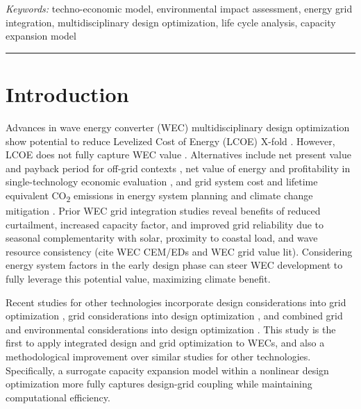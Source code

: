 \documentclass[10pt,twoside]{article}
\begin{document}
\vspace{.5\baselineskip}
\textit{Keywords:} techno-economic model, environmental impact assessment, energy grid integration, multidisciplinary design optimization, life cycle analysis, capacity expansion model

\noindent\rule{\textwidth}{0.4pt}

\section{Introduction}
Advances in wave energy converter (WEC) multidisciplinary design optimization show potential to reduce Levelized Cost of Energy (LCOE) X-fold \cite{mccabe_leveraging_2025}.
However, LCOE does not fully capture WEC value \cite{mowers_evaluation_2021,moraski_beyond_2025}.
Alternatives include net present value and payback period for off-grid contexts \cite{jenne_powering_2021}, net value of energy and profitability in single-technology economic evaluation \cite{mowers_evaluation_2021,makaremi_economic_2025}, and grid system cost and lifetime equivalent CO\textsubscript{2} emissions in energy system planning and climate change mitigation \cite{moraski_beyond_2025}.
Prior WEC grid integration studies reveal benefits of reduced curtailment, increased capacity factor, and improved grid reliability due to seasonal complementarity with solar, proximity to coastal load, and wave resource consistency (cite WEC CEM/EDs and WEC grid value lit).
Considering energy system factors in the early design phase can steer WEC development to fully leverage this potential value, maximizing climate benefit.

Recent studies for other technologies incorporate design considerations into grid optimization \cite{schwartz_value_2023,ricks_value_2022}, grid considerations into design optimization \cite{mehta_designing_2024}, and combined grid and environmental considerations into design optimization \cite{canet_eco-conscious_2023,kainz_how_2024}.
This study is the first to apply integrated design and grid optimization to WECs, and also a methodological improvement over similar studies for other technologies. 
Specifically, a surrogate capacity expansion model within a nonlinear design optimization more fully captures design-grid coupling while maintaining computational efficiency.
\end{document}
